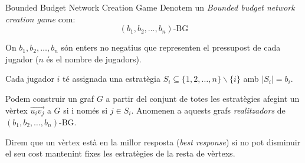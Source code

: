 \documentclass[aspectratio=169,handout]{beamer}
\begin{document}
\begin{frame}{Bounded Budget Network Creation Game}
    Denotem un \emph{Bounded budget network creation game} com:
    $$ (b_1, b_2, \dots , b_n)\text{-BG} $$
    
    On $b_1,b_2, \dots , b_n$ són enters no negatius que representen el pressupost de cada jugador ($n$ és el nombre de jugadors).
    
    \vspace{1em}
    
    Cada jugador $i$ té assignada una estratègia $S_i \subseteq \{1, 2, \dots , n\} \backslash \{i\}$ amb
    $|S_i| = b_i$.
    
    \vspace{1em}
    
    Podem construir un graf $G$ a partir del conjunt de totes les estratègies afegint un vèrtex $\overrightarrow{u_iv_j}$
    a $G$ si i només si $j \in S_i$. Anomenen a aquests grafs \emph{realitzadors} de
    $ (b_1, b_2, \dots , b_n)\text{-BG} $.
    
    \vspace{1em}
    
    Direm que un vèrtex està en la millor resposta (\emph{best response}) si no pot disminuir el seu
    cost mantenint fixes les estratègies de la resta de vèrtexs.
\end{frame}
\end{document}
